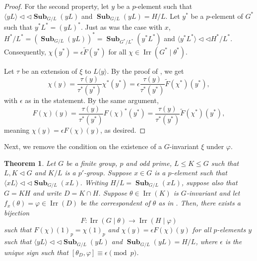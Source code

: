 \documentclass[12pt]{amsart}
\DeclareMathOperator{\Sub}{\mathbf{Sub}}
\DeclareMathOperator{\Irr}{Irr}
\theoremstyle{remark}
\theoremstyle{definition}
\theoremstyle{plain}
\newtheorem{thm}{Theorem}[section]
\theoremstyle{definition}
\numberwithin{equation}{section}
\begin{document}
\begin{proof}
	For the second property, let $y$ be a $p$-element such that $\langle yL \rangle {\triangleleft}{\triangleleft} \Sub_{G/L}(yL)$ and $\Sub_{G/L}(yL) = H/L$. Let $y^*$ be a $p$-element of $G^*$ such that $y^*L^* = (yL)^*$. Just as was the case with $x$, $H^*/L^* = (\Sub_{G/L}(yL))^* = \Sub_{G^*/L^*}(y^*L^*)$ and $\langle y^*L^* \rangle {\triangleleft}{\triangleleft} H^*/L^*$. Consequently, $\chi(y^*) = \epsilon \tilde{F}(y^*)$ for all $\chi \in \Irr(G^* \mid \theta^*)$.
	
	Let $\tau$ be an extension of $\xi$ to $L\langle y \rangle$. By the proof of \cite[Lemma 5.17]{CTMcKC}, we get
	\begin{equation*}
		\chi(y) = \frac{\tau(y)}{\tau^*(y^*)}\chi^*(y^*) = \epsilon \frac{\tau(y)}{\tau^*(y^*)} \tilde{F}(\chi^*)(y^*),
	\end{equation*}
	with $\epsilon$ as in the statement. By the same argument,
	\begin{equation*}
		F(\chi)(y) = \frac{\tau(y)}{\tau^*(y^*)} F(\chi)^*(y^*) = \frac{\tau(y)}{\tau^*(y^*)} \tilde{F}(\chi^*)(y^*),
	\end{equation*} 
	meaning $\chi(y) = \epsilon F(\chi)(y)$, as desired.
\end{proof}

Next, we remove the condition on the existence of a $G$-invariant $\xi$ under $\varphi$.

\begin{thm}
	\label{Part3}
	Let $G$ be a finite group, $p$ and odd prime, $L \leq K \leq G$ such that $L, K \lhd G$ and $K/L$ is a $p'$-group. Suppose $x \in G$ is a $p$-element such that $\langle xL \rangle {\triangleleft}{\triangleleft} \Sub_{G/L}(xL)$. Writing $H/L = \Sub_{G/L}(xL)$, suppose also that $G = KH$ and write $D = K \cap H$. Suppose $\theta \in \Irr(K)$ is $G$-invariant and let $f_x(\theta) = \varphi \in \Irr(D)$ be the correspondent of $\theta$ as in . Then, there exists a bijection
	\begin{equation*}
		F: \Irr(G \mid \theta) \to \Irr(H \mid \varphi)
	\end{equation*}
	such that $F(\chi)(1)_p = \chi(1)_p$ and $\chi(y) = \epsilon F(\chi)(y)$ for all $p$-elements $y$ such that $\langle yL \rangle {\triangleleft}{\triangleleft} \Sub_{G/L}(yL)$ and $\Sub_{G/L}(yL) = H/L$, where $\epsilon$ is the unique sign such that $[\theta_D, \varphi] \equiv \epsilon \pmod{p}$.
\end{thm}
\end{document}
